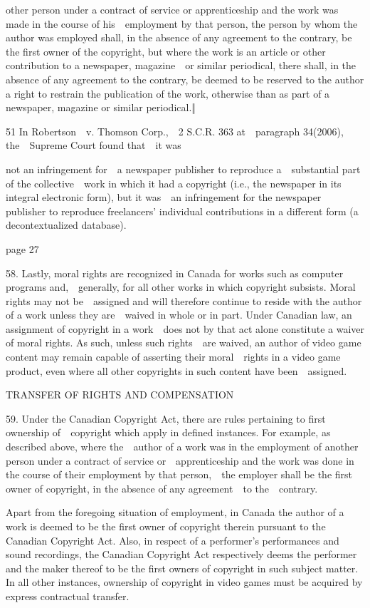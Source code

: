 \documentclass[
]{article}
\begin{document}
{other person under a contract of service or apprenticeship and the work
was made in the course of his~~employment by that person, the person by
whom the author was employed shall, in the absence of any agreement to
the contrary, be the first owner of the copyright, but where the work is
an article or other contribution to a newspaper, magazine~~or similar
periodical, there shall, in the absence of any agreement to the
contrary, be deemed to be reserved to the author a right to restrain the
publication of the work, otherwise than as part of a newspaper, magazine
or similar periodical}{.‖}

{51 }{In }{Robertson~~v. Thomson Corp.,~~}{2 S.C.R. 363 at~~paragraph
34(2006), the~~Supreme Court found that~~it was}

{not an infringement for~~a newspaper publisher to reproduce
a~~substantial part of the collective~~work in which it had a copyright
(i.e., the newspaper in its integral electronic form), but it was~~an
infringement for the newspaper publisher to }{reproduce freelancers'
individual contributions in a different form (a decontextualized
database).}

{page 27}

{58. }{Lastly, moral rights are recognized in Canada for works such as
computer programs and,~~generally, for all other works in which
copyright subsists. Moral rights may not be~~assigned and will therefore
continue to reside with the author of a work unless they are~~waived in
whole or in part. Under Canadian law, an assignment of copyright in a
work~~does not by that act alone constitute a waiver of moral rights. As
such, unless such rights~~are waived, an author of video game content
may remain capable of asserting their moral~~rights in a video game
product, even where all other copyrights in such content have
been~~assigned.}

{TRANSFER OF RIGHTS AND COMPENSATION}

{59. }{Under the Canadian }{Copyright Act}{, there are rules pertaining
to first ownership of~~copyright which apply in defined instances. For
example, as described above, where the~~author of a work was in the
employment of another person under a contract of service
or~~apprenticeship and the work was done in the course of their
employment by that person,~~the employer shall be the first owner of
copyright, in the absence of any agreement~~to the~~contrary.}

{Apart from the foregoing situation of employment, in Canada the author
of a work is deemed to be the first owner of copyright therein pursuant
to the Canadian }{Copyright Act}{. }{Also, in respect of a performer's
performances and sound recordings, the Canadian }{Copyright Act
}{respectively deems the performer and the maker thereof to be the first
owners of copyright in such subject matter. In all other instances,
ownership of copyright in video games must be acquired by express
contractual transfer.}
\end{document}
